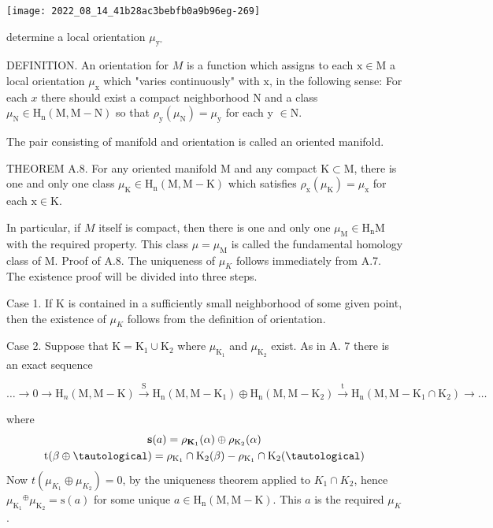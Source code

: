 \documentclass[10pt]{article}
\begin{document}
\texttt{[image: 2022\_08\_14\_41b28ac3bebfb0a9b96eg-269]}

determine a local orientation $\mu_{\mathrm{y}^{\circ}}$

DEFINITION. An orientation for $M$ is a function which assigns to each $\mathrm{x} \in \mathrm{M}$ a local orientation $\mu_{\mathrm{x}}$ which "varies continuously" with $\mathrm{x}$, in the following sense: For each $x$ there should exist a compact neighborhood $\mathrm{N}$ and a class $\mu_{\mathrm{N}} \in \mathrm{H}_{\mathrm{n}}(\mathrm{M}, \mathrm{M}-\mathrm{N})$ so that $\rho_{\mathrm{y}}\left(\mu_{\mathrm{N}}\right)=\mu_{\mathrm{y}}$ for each y $\in \mathrm{N}$.

The pair consisting of manifold and orientation is called an oriented manifold.

THEOREM A.8. For any oriented manifold $\mathrm{M}$ and any compact $\mathrm{K} \subset \mathrm{M}$, there is one and only one class $\mu_{\mathrm{K}} \in \mathrm{H}_{\mathrm{n}}(\mathrm{M}, \mathrm{M}-\mathrm{K})$ which satisfies $\rho_{\mathrm{x}}\left(\mu_{\mathrm{K}}\right)=\mu_{\mathrm{x}}$ for each $\mathrm{x} \in \mathrm{K}$.

In particular, if $M$ itself is compact, then there is one and only one $\mu_{\mathrm{M}} \in \mathrm{H}_{\mathrm{n}} \mathrm{M}$ with the required property. This class $\mu=\mu_{\mathrm{M}}$ is called the fundamental homology class of M. Proof of A.8. The uniqueness of $\mu_{K}$ follows immediately from A.7. The existence proof will be divided into three steps.

Case 1. If $\mathrm{K}$ is contained in a sufficiently small neighborhood of some given point, then the existence of $\mu_{K}$ follows from the definition of orientation.

Case 2. Suppose that $\mathrm{K}=\mathrm{K}_{1} \cup \mathrm{K}_{2}$ where $\mu_{\mathrm{K}_{1}}$ and $\mu_{\mathrm{K}_{2}}$ exist. As in A. 7 there is an exact sequence

$\ldots \rightarrow 0 \rightarrow \mathrm{H}_{n}(\mathrm{M}, \mathrm{M}-\mathrm{K}) \stackrel{\mathrm{S}}{\rightarrow} \mathrm{H}_{\mathrm{n}}\left(\mathrm{M}, \mathrm{M}-\mathrm{K}_{1}\right) \oplus \mathrm{H}_{\mathrm{n}}\left(\mathrm{M}, \mathrm{M}-\mathrm{K}_{2}\right) \stackrel{\mathrm{t}}{\rightarrow} \mathrm{H}_{\mathrm{n}}\left(\mathrm{M}, \mathrm{M}-\mathrm{K}_{1} \cap \mathrm{K}_{2}\right) \rightarrow \ldots$

where
$$
\begin{gathered}
\mathbf{s}(a)=\rho_{\mathbf{K}_{1}}(\alpha) \oplus \rho_{\mathrm{K}_{2}}(\alpha) \\
\mathrm{t}(\beta \oplus \tautological)=\rho_{\mathrm{K}_{1}} \cap \mathrm{K}_{2}(\beta)-\rho_{\mathrm{K}_{1}} \cap \mathrm{K}_{2}(\tautological)
\end{gathered}
$$
Now $t\left(\mu_{K_{1}} \oplus \mu_{K_{2}}\right)=0$, by the uniqueness theorem applied to $K_{1} \cap K_{2}$, hence $\mu_{\mathrm{K}_{1}}{ }^{\oplus} \mu_{\mathrm{K}_{2}}=\mathrm{s}(a)$ for some unique $a \in \mathrm{H}_{\mathrm{n}}(\mathrm{M}, \mathrm{M}-\mathrm{K})$. This $a$ is the required $\mu_{K}$.
\end{document}
